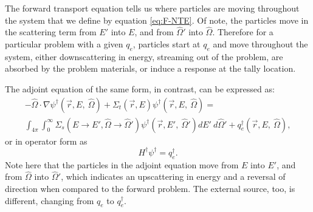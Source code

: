 The forward transport equation tells us where particles are moving
throughout the system that we define by equation \ref{eq:F-NTE}. Of note, the
particles move in the scattering term from $E'$ into $E$, and from $\hat\Omega'$
into $\hat\Omega$. Therefore for a particular problem with a given $q_{e}$,
particles start at $q_e$ and move throughout the system,
either downscattering in energy, streaming out of the problem,
are absorbed by the problem materials, or
induce a response at the tally location.

The adjoint equation of the same form, in contrast, can be expressed as:
\begin{multline}
-\hat\Omega \cdot \nabla \psi^{\dagger}
        (\vec {r} ,E,\:\hat\Omega)+\Sigma _{ t }
        (\vec{r},E)\psi^{\dagger}  (\vec { r } ,E,\:\hat\Omega)
       = \\
        \int _{ 4\pi  } \int _{ 0 }^{ \infty  } \Sigma _{ s }(E\rightarrow E',
        \hat\Omega\rightarrow\hat\Omega')\psi^{\dagger}  (\vec { r } ,E',\:
        \hat\Omega')dE' \:d\hat\Omega' + q_{e}^\dagger(\vec { r } ,E,
        \:\hat\Omega),
\label{eq:A-NTE}
\end{multline}
or in operator form as
\begin{equation}
  H^{\dagger} \psi^{\dagger} = q_{e}^{\dagger}.
\label{eq:A-NTE2}
\end{equation}
Note here that the particles in the adjoint equation move from $E$ into $E'$, and
from $\hat\Omega$ into $\hat\Omega'$, which indicates an upscattering in energy
and a reversal of direction when compared to the forward problem.
The external source, too, is different, changing
from $q_{e}$ to $q_{e}^\dagger$.

